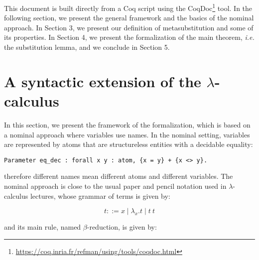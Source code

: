 This document is built directly from a Coq script using the CoqDoc\footnote{\url{https://coq.inria.fr/refman/using/tools/coqdoc.html}} tool. In the following section, we present the general framework and the basics of the nominal approach. In Section 3, we present our definition of metasubstitution and some of its properties. In Section 4, we present the formalization of the main theorem, {\it i.e.} the substitution lemma, and we conclude in Section 5.

\section{A syntactic extension of the $\lambda$-calculus}



 In this section, we present the framework of the formalization, which is based on a nominal approach\cite{gabbayNewApproachAbstract1999} where variables use names. In the nominal setting, variables are represented by atoms that are structureless entities with a decidable equality: 


\begin{verbatim}
Parameter eq_dec : forall x y : atom, {x = y} + {x <> y}.
\end{verbatim}


\noindent therefore different names mean different atoms and different variables. The nominal approach is close to the usual paper and pencil notation used in $\lambda$-calculus lectures, whose grammar of terms is given by:


\begin{equation}\label{lambda:grammar}
 t ::= x \mid \lambda_x.t \mid t\ t
\end{equation}


\noindent and its main rule, named $\beta$-reduction, is given by:


